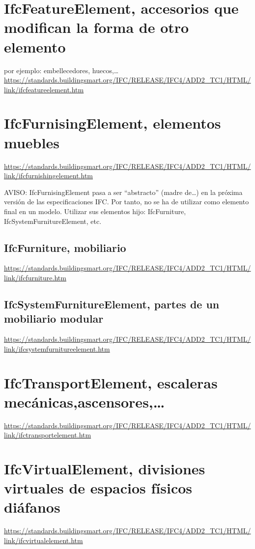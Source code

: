 \documentclass[spanish,12pt,a4paper,final,oneside]{book}
\begin{document}
\section{IfcFeatureElement, accesorios que modifican la forma de otro elemento}
 por ejemplo: embellecedores, huecos,\ldots
\\ \url{https://standards.buildingsmart.org/IFC/RELEASE/IFC4/ADD2_TC1/HTML/link/ifcfeatureelement.htm}


\section{IfcFurnisingElement, elementos muebles}
\url{https://standards.buildingsmart.org/IFC/RELEASE/IFC4/ADD2_TC1/HTML/link/ifcfurnishingelement.htm}

AVISO: IfcFurnisingElement pasa a ser ``abstracto'' (madre de\ldots) en la próxima versión de las especificaciones IFC. Por tanto, no se ha de utilizar como elemento final en un modelo. Utilizar sus elementos hijo: IfcFurniture, IfcSystemFurnitureElement, etc. 

\subsection{IfcFurniture, mobiliario}
\url{https://standards.buildingsmart.org/IFC/RELEASE/IFC4/ADD2_TC1/HTML/link/ifcfurniture.htm}

\subsection{IfcSystemFurnitureElement, partes de un mobiliario modular}
\url{https://standards.buildingsmart.org/IFC/RELEASE/IFC4/ADD2_TC1/HTML/link/ifcsystemfurnitureelement.htm}




\section{IfcTransportElement, escaleras mecánicas,ascensores,\ldots}
\url{https://standards.buildingsmart.org/IFC/RELEASE/IFC4/ADD2_TC1/HTML/link/ifctransportelement.htm}


\section{IfcVirtualElement, divisiones virtuales de espacios físicos diáfanos}
\url{https://standards.buildingsmart.org/IFC/RELEASE/IFC4/ADD2_TC1/HTML/link/ifcvirtualelement.htm}
\end{document}
